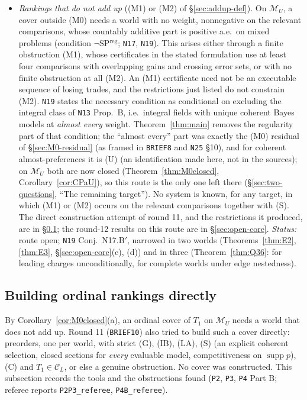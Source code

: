 \documentclass[11pt]{article}
\theoremstyle{definition}
\theoremstyle{remark}
\newcommand{\M}{\mathcal M}
\newcommand{\C}{\mathcal C}
\newcommand{\supp}{\operatorname{supp}}
\newcommand{\src}[1]{\texttt{#1}}
\begin{document}
\begin{itemize}[leftmargin=*]
\item \emph{Rankings that do not add up} ((M1) or (M2) of \S\ref{sec:addup-def}). On $\M_U$, a cover outside (M0) needs a world with no weight, nonnegative on the relevant comparisons, whose countably additive part is positive a.e.\ on mixed problems (condition $\neg$SP$^{\mathrm{reg}}$; \src{N17}, \src{N19}). This arises either through a finite obstruction (M1), whose certificates in the stated formulation use at least four comparisons with overlapping gains and crossing error sets, or with no finite obstruction at all (M2). An (M1) certificate need not be an executable sequence of losing trades, and the restrictions just listed do not constrain (M2). \src{N19} states the necessary condition as conditional on excluding the integral class of \src{N13} Prop.~B, i.e.\ integral fields with unique coherent Bayes models at \emph{almost every} weight. Theorem~\ref{thm:main} removes the regularity part of that condition; the ``almost every'' part was exactly the (M0) residual of \S\ref{sec:M0-residual} (as framed in \src{BRIEF8} and \src{N25} \S10), and for coherent almost-preferences it is (U) (an identification made here, not in the sources); on $\M_U$ both are now closed (Theorem~\ref{thm:M0closed}, Corollary~\ref{cor:CPaU}), so this route is the only one left there (\S\ref{sec:two-questions}, ``The remaining target''). No system is known, for any target, in which (M1) or (M2) occurs on the relevant comparisons together with (S). The direct construction attempt of round 11, and the restrictions it produced, are in \S\ref{sec:open-ordinal}; the round-12 results on this route are in \S\ref{sec:open-core}. \emph{Status:} route open; \src{N19} Conj.~N17.B$'$, narrowed in two worlds (Theorems~\ref{thm:E2}, \ref{thm:E3}, \S\ref{sec:open-core}(c), (d)) and in three (Theorem~\ref{thm:Q36}: for leading charges unconditionally, for complete worlds under edge nestedness).
\end{itemize}

\subsection{Building ordinal rankings directly}\label{sec:open-ordinal}
By Corollary~\ref{cor:M0closed}(a), an ordinal cover of $T_1$ on $\M_U$ needs a world that does not add up. Round 11 (\src{BRIEF10}) also tried to build such a cover directly: preorders, one per world, with strict (G), (IB), (LA), (S) (an explicit coherent selection, closed sections for \emph{every} evaluable model, competitiveness on $\supp p$), (C) and $T_1\in\C_L$, or else a genuine obstruction. No cover was constructed. This subsection records the tools and the obstructions found (\src{P2}, \src{P3}, \src{P4} Part B; referee reports \src{P2P3\_referee}, \src{P4B\_referee}).
\end{document}
